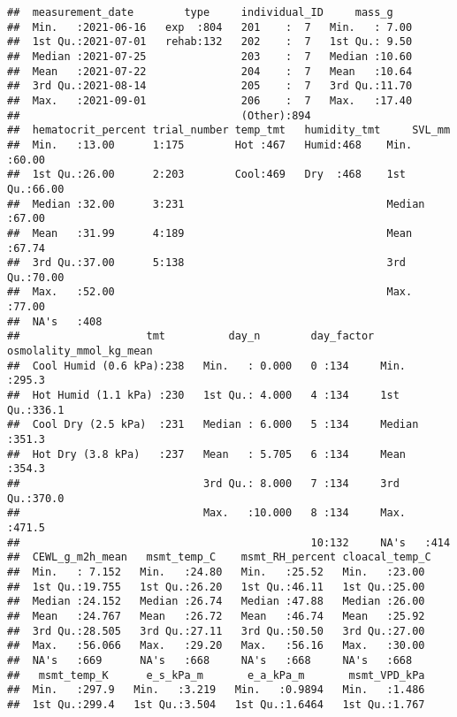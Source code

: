 \documentclass[
]{article}
\begin{document}
\begin{verbatim}
##  measurement_date        type     individual_ID     mass_g     
##  Min.   :2021-06-16   exp  :804   201    :  7   Min.   : 7.00  
##  1st Qu.:2021-07-01   rehab:132   202    :  7   1st Qu.: 9.50  
##  Median :2021-07-25               203    :  7   Median :10.60  
##  Mean   :2021-07-22               204    :  7   Mean   :10.64  
##  3rd Qu.:2021-08-14               205    :  7   3rd Qu.:11.70  
##  Max.   :2021-09-01               206    :  7   Max.   :17.40  
##                                   (Other):894                  
##  hematocrit_percent trial_number temp_tmt   humidity_tmt     SVL_mm     
##  Min.   :13.00      1:175        Hot :467   Humid:468    Min.   :60.00  
##  1st Qu.:26.00      2:203        Cool:469   Dry  :468    1st Qu.:66.00  
##  Median :32.00      3:231                                Median :67.00  
##  Mean   :31.99      4:189                                Mean   :67.74  
##  3rd Qu.:37.00      5:138                                3rd Qu.:70.00  
##  Max.   :52.00                                           Max.   :77.00  
##  NA's   :408                                                            
##                    tmt          day_n        day_factor osmolality_mmol_kg_mean
##  Cool Humid (0.6 kPa):238   Min.   : 0.000   0 :134     Min.   :295.3          
##  Hot Humid (1.1 kPa) :230   1st Qu.: 4.000   4 :134     1st Qu.:336.1          
##  Cool Dry (2.5 kPa)  :231   Median : 6.000   5 :134     Median :351.3          
##  Hot Dry (3.8 kPa)   :237   Mean   : 5.705   6 :134     Mean   :354.3          
##                             3rd Qu.: 8.000   7 :134     3rd Qu.:370.0          
##                             Max.   :10.000   8 :134     Max.   :471.5          
##                                              10:132     NA's   :414            
##  CEWL_g_m2h_mean   msmt_temp_C    msmt_RH_percent cloacal_temp_C 
##  Min.   : 7.152   Min.   :24.80   Min.   :25.52   Min.   :23.00  
##  1st Qu.:19.755   1st Qu.:26.20   1st Qu.:46.11   1st Qu.:25.00  
##  Median :24.152   Median :26.74   Median :47.88   Median :26.00  
##  Mean   :24.767   Mean   :26.72   Mean   :46.74   Mean   :25.92  
##  3rd Qu.:28.505   3rd Qu.:27.11   3rd Qu.:50.50   3rd Qu.:27.00  
##  Max.   :56.066   Max.   :29.20   Max.   :56.16   Max.   :30.00  
##  NA's   :669      NA's   :668     NA's   :668     NA's   :668    
##   msmt_temp_K      e_s_kPa_m       e_a_kPa_m       msmt_VPD_kPa  
##  Min.   :297.9   Min.   :3.219   Min.   :0.9894   Min.   :1.486  
##  1st Qu.:299.4   1st Qu.:3.504   1st Qu.:1.6464   1st Qu.:1.767  

\end{verbatim}
\end{document}

